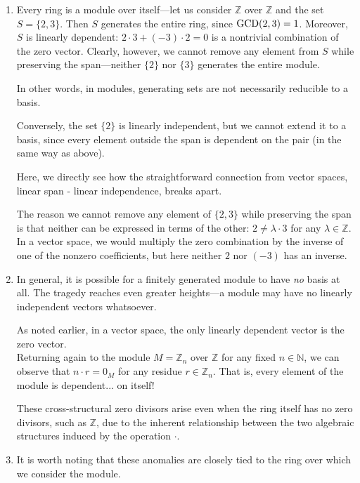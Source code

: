 \documentclass{article}
\newif\ifusemulticols
\theoremstyle{definition}
\theoremstyle{remark}
\theoremstyle{plain}
\theoremstyle{plain}
\newenvironment{mymulticols}
    { \ifusemulticols \begin{multicols}{2} \fi }
    { \ifusemulticols \end{multicols} \fi }
\newcommand{\N}{\mathbb{N}}
\newcommand{\Z}{\mathbb{Z}}
\begin{document}
\begin{mymulticols}
\begin{enumerate}
    \item Every ring is a module over itself—let us consider $\Z$ over $\Z$ and the set $S = \{2,
        3\}$.
        Then $S$ generates the entire ring, since $\textnormal{GCD}(2, 3) = 1$. Moreover, $S$ is
        linearly dependent: $2 \cdot 3 + (-3) \cdot 2 = 0$ is a nontrivial combination of the zero vector.
        Clearly, however, we cannot remove any element from $S$ while preserving the span—neither
        $\{2\}$ nor $\{3\}$ generates the entire module.

        In other words, in modules, generating sets are not necessarily reducible to a basis.

        Conversely, the set $\{2\}$ is linearly independent, but we cannot extend it to a basis,
        since every element outside the span is dependent on the pair (in the same way as above).

        Here, we directly see how the straightforward connection from vector spaces, \quotedblbase
        linear span - linear independence,\quotedblright{} breaks apart.

        The reason we cannot remove any element of $\{2, 3\}$ while preserving the span is that
        neither can be expressed in terms of the other: $2 \neq \lambda \cdot 3$ for any $\lambda
        \in \Z$.
        In a vector space, we would multiply the zero combination by the inverse of one of the
        nonzero coefficients, but here neither $2$ nor $(-3)$ has an inverse.

    \item In general, it is possible for a finitely generated module to have \emph{no} basis at all.
        The tragedy reaches even greater heights—a module may have no linearly independent vectors
        whatsoever.

        As noted earlier, in a vector space, the only linearly dependent vector is the zero
        vector.\\ Returning again to the module $M = \Z_n$ over $\Z$ for any fixed $n \in \N$, we
        can observe that $n \cdot r = 0_M$ for any residue $r \in \Z_n$. That is, every element of
        the module is dependent... on itself!

        These cross-structural zero divisors arise even when the ring itself has no zero divisors,
        such as $\Z$, due to the inherent relationship between the two algebraic structures induced by
        the operation $\cdot$.

    \item It is worth noting that these anomalies are closely tied to the ring over which we
        consider the module.


\end{enumerate}
\end{mymulticols}
\end{document}
